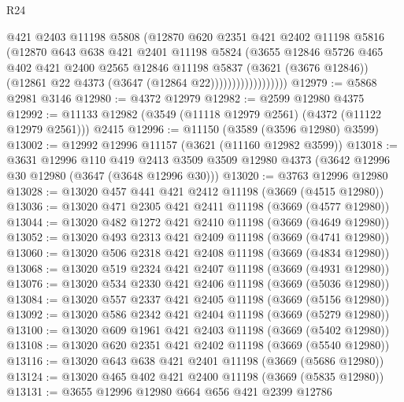 \begin{lexlean}{R24}
\begin{coremodule}
                            @421
                            @2403
                            @11198
                            @5808
                            (@12870
                              @620
                              @2351
                              @421
                              @2402
                              @11198
                              @5816
                              (@12870
                                @643
                                @638
                                @421
                                @2401
                                @11198
                                @5824
                                (@3655
                                  @12846
                                  @5726
                                  @465
                                  @402
                                  @421
                                  @2400
                                  @2565
                                  @12846
                                  @11198
                                  @5837
                                  (@3621 (@3676 @12846))
                                  (@12861 @22 @4373 (@3647 (@12864 @22))))))))))))))))))
@12979 := @5868 @2981 @3146
@12980 := @4372 @12979
@12982 := @2599 @12980 @4375
@12992 := @11133 @12982 (@3549 (@11118 @12979 @2561) (@4372 (@11122 @12979 @2561))) @2415
@12996 := @11150 (@3589 (@3596 @12980) @3599)
@13002 := @12992 @12996 @11157 (@3621 (@11160 @12982 @3599))
@13018 := @3631
    @12996
    @110
    @419
    @2413
    @3509
    @3509
    @12980
    @4373
    (@3642 @12996 @30 @12980 (@3647 (@3648 @12996 @30)))
@13020 := @3763 @12996 @12980
@13028 := @13020 @457 @441 @421 @2412 @11198 (@3669 (@4515 @12980))
@13036 := @13020 @471 @2305 @421 @2411 @11198 (@3669 (@4577 @12980))
@13044 := @13020 @482 @1272 @421 @2410 @11198 (@3669 (@4649 @12980))
@13052 := @13020 @493 @2313 @421 @2409 @11198 (@3669 (@4741 @12980))
@13060 := @13020 @506 @2318 @421 @2408 @11198 (@3669 (@4834 @12980))
@13068 := @13020 @519 @2324 @421 @2407 @11198 (@3669 (@4931 @12980))
@13076 := @13020 @534 @2330 @421 @2406 @11198 (@3669 (@5036 @12980))
@13084 := @13020 @557 @2337 @421 @2405 @11198 (@3669 (@5156 @12980))
@13092 := @13020 @586 @2342 @421 @2404 @11198 (@3669 (@5279 @12980))
@13100 := @13020 @609 @1961 @421 @2403 @11198 (@3669 (@5402 @12980))
@13108 := @13020 @620 @2351 @421 @2402 @11198 (@3669 (@5540 @12980))
@13116 := @13020 @643 @638 @421 @2401 @11198 (@3669 (@5686 @12980))
@13124 := @13020 @465 @402 @421 @2400 @11198 (@3669 (@5835 @12980))
@13131 := @3655 @12996 @12980 @664 @656 @421 @2399 @12786

\end{coremodule}
\end{lexlean}
